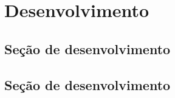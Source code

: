 \chapter{Desenvolvimento}
\lipsum[1-3]

\section{Seção de desenvolvimento}
\lipsum

\section{Seção de desenvolvimento}
\lipsum
%
%
